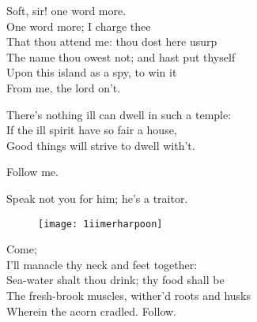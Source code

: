 \begin{verse_speech}[Prospero] 
Soft, sir! one word more.\\
One word more; I charge thee\\
That thou attend me: thou dost here usurp\\
The name thou owest not; and hast put thyself\\
Upon this island as a spy, to win it\\
From me, the lord on't.
\end{verse_speech}

	
\begin{verse_speech}[Miranda] 
There's nothing ill can dwell in such a temple:\\
If the ill spirit have so fair a house,\\
Good things will strive to dwell with't.
\end{verse_speech}

\begin{verse_speech}[Prospero] 
Follow me.\\

Speak not you for him; he's a traitor. \\

\begin{figure}[tb]
\centering
\texttt{[image: 1iimerharpoon]}
\end{figure}

Come;\\
I'll manacle thy neck and feet together:\\
Sea-water shalt thou drink; thy food shall be\\
The fresh-brook muscles, wither'd roots and husks\\
Wherein the acorn cradled. Follow.\\
\end{verse_speech}

